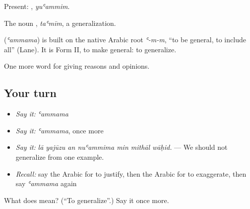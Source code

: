 Present: , \emph{yuʿammim}.

The noun , \emph{taʿmīm}, a generalization.

\begin{cousinweb}
\textbf{} (\emph{ʿammama}) is built on the native Arabic root \emph{ʿ-m-m}, \textquotedblleft{}to be general, to include all\textquotedblright{} (Lane). It is Form II, to make general: to generalize.
\end{cousinweb}

\begin{grammarlens}[title={What you've built}]
One more word for giving reasons and opinions.
\end{grammarlens}

\subsection*{Your turn}
\begin{itemize}
\raggedright
  \item \emph{Say it:} \emph{ʿammama}
  \item \emph{Say it:} \emph{ʿammama}, once more
  \item \emph{Say it:} \emph{lā yajūzu an nuʿammima min mithāl wāḥid.} — We should not generalize from one example.
  \item \emph{Recall:} say the Arabic for to justify, then the Arabic for to exaggerate, then say \emph{ʿammama} again
\end{itemize}

\begin{tcolorbox}[breakable,colback=teal!4,colframe=teal!35!black,title={Before you move on}]
What does  mean? (\textquotedblleft{}To generalize\textquotedblright{}.) Say it once more.
\end{tcolorbox}
